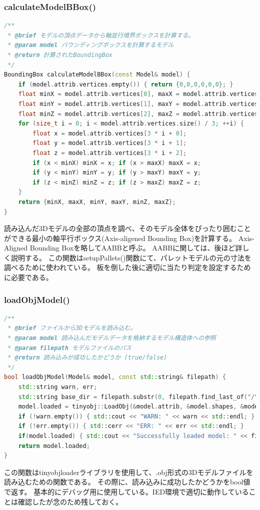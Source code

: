 \documentclass[uplatex,dvipdfmx,a4paper]{jsarticle}
\begin{document}
\hypertarget{func:calculateModelBBox}{}\subsubsection{calculateModelBBox()}\label{func:calculateModelBBox}
\begin{lstlisting}[language=C++, caption={calculateModelBBox() 関数}, label={lst:calculateModelBBox_detail}]
/**
 * @brief モデルの頂点データから軸並行境界ボックスを計算する。
 * @param model バウンディングボックスを計算するモデル
 * @return 計算されたBoundingBox
 */
BoundingBox calculateModelBBox(const Model& model) {
    if (model.attrib.vertices.empty()) { return {0,0,0,0,0,0}; }
    float minX = model.attrib.vertices[0], maxX = model.attrib.vertices[0];
    float minY = model.attrib.vertices[1], maxY = model.attrib.vertices[1];
    float minZ = model.attrib.vertices[2], maxZ = model.attrib.vertices[2];
    for (size_t i = 0; i < model.attrib.vertices.size() / 3; ++i) {
        float x = model.attrib.vertices[3 * i + 0];
        float y = model.attrib.vertices[3 * i + 1];
        float z = model.attrib.vertices[3 * i + 2];
        if (x < minX) minX = x; if (x > maxX) maxX = x;
        if (y < minY) minY = y; if (y > maxY) maxY = y;
        if (z < minZ) minZ = z; if (z > maxZ) maxZ = z;
    }
    return {minX, maxX, minY, maxY, minZ, maxZ};
}
\end{lstlisting}
読み込んだ3Dモデルの全部の頂点を調べ、そのモデル全体をぴったり囲むことができる最小の軸平行ボックス(Axis-aligened Bounding Box)を計算する。
Axis-Aligned Bounding Boxを略してAABBと呼ぶ。
AABBに関しては、後ほど詳しく説明する。
この関数はsetupPallets()関数にて、パレットモデルの元の寸法を調べるために使われている。
板を倒した後に適切に当たり判定を設定するために必要である。

\hypertarget{func:loadObjModel}{}\subsubsection{loadObjModel()}\label{func:loadObjModel}
\begin{lstlisting}[language=C++, caption={loadObjModel() 関数}, label={lst:loadObjModel_detail}]
/**
 * @brief ファイルから3Dモデルを読み込む。
 * @param model 読み込んだモデルデータを格納するモデル構造体への参照
 * @param filepath モデルファイルのパス
 * @return 読み込みが成功したかどうか (true/false)
 */
bool loadObjModel(Model& model, const std::string& filepath) {
    std::string warn, err;
    std::string base_dir = filepath.substr(0, filepath.find_last_of("/\\") + 1);
    model.loaded = tinyobj::LoadObj(&model.attrib, &model.shapes, &model.materials, &warn, &err, filepath.c_str(), base_dir.c_str());
    if (!warn.empty()) { std::cout << "WARN: " << warn << std::endl; }
    if (!err.empty()) { std::cerr << "ERR: " << err << std::endl; }
    if(model.loaded) { std::cout << "Successfully loaded model: " << filepath << std::endl; }
    return model.loaded;
}
\end{lstlisting}
この関数はtinyobjloaderライブラリを使用して、.obj形式の3Dモデルファイルを読み込むための関数である。
その際に、読み込みに成功したかどうかをbool値で返す。
基本的にデバッグ用に使用している。IED環境で適切に動作していることは確認したが念のため残しておく。
\end{document}
